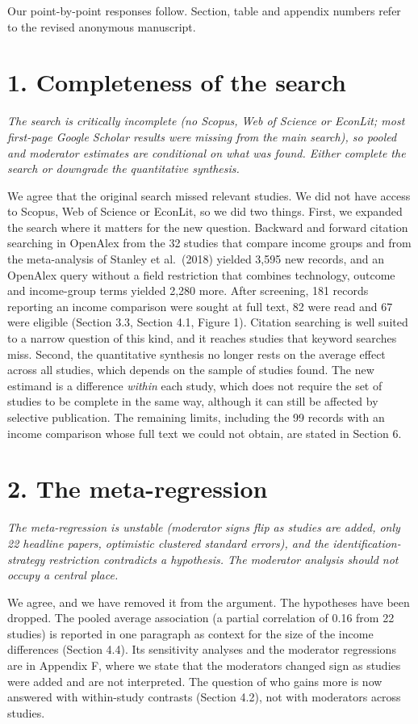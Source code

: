 \documentclass[11pt,a4paper]{article}
\newenvironment{comment}{\par\medskip\noindent\begin{minipage}{\textwidth}\itshape}{\end{minipage}\par\smallskip}
\begin{document}
Our point-by-point responses follow. Section, table and appendix numbers refer to the revised anonymous manuscript.

\section*{1. Completeness of the search}
\begin{comment}
The search is critically incomplete (no Scopus, Web of Science or EconLit; most first-page Google Scholar results were missing from the main search), so pooled and moderator estimates are conditional on what was found. Either complete the search or downgrade the quantitative synthesis.
\end{comment}
We agree that the original search missed relevant studies. We did not have access to Scopus, Web of Science or EconLit, so we did two things. First, we expanded the search where it matters for the new question. Backward and forward citation searching in OpenAlex from the 32 studies that compare income groups and from the meta-analysis of Stanley et al.\ (2018) yielded 3,595 new records, and an OpenAlex query without a field restriction that combines technology, outcome and income-group terms yielded 2,280 more. After screening, 181 records reporting an income comparison were sought at full text, 82 were read and 67 were eligible (Section 3.3, Section 4.1, Figure 1). Citation searching is well suited to a narrow question of this kind, and it reaches studies that keyword searches miss. Second, the quantitative synthesis no longer rests on the average effect across all studies, which depends on the sample of studies found. The new estimand is a difference \emph{within} each study, which does not require the set of studies to be complete in the same way, although it can still be affected by selective publication. The remaining limits, including the 99 records with an income comparison whose full text we could not obtain, are stated in Section 6.

\section*{2. The meta-regression}
\begin{comment}
The meta-regression is unstable (moderator signs flip as studies are added, only 22 headline papers, optimistic clustered standard errors), and the identification-strategy restriction contradicts a hypothesis. The moderator analysis should not occupy a central place.
\end{comment}
We agree, and we have removed it from the argument. The hypotheses have been dropped. The pooled average association (a partial correlation of 0.16 from 22 studies) is reported in one paragraph as context for the size of the income differences (Section 4.4). Its sensitivity analyses and the moderator regressions are in Appendix F, where we state that the moderators changed sign as studies were added and are not interpreted. The question of who gains more is now answered with within-study contrasts (Section 4.2), not with moderators across studies.
\end{document}
